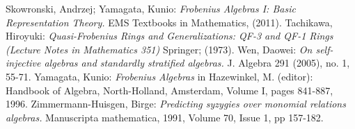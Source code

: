 \documentclass[a4paper]{amsart}
\theoremstyle{definition}
\theoremstyle{remark}
\numberwithin{equation}{theorem}
\begin{document}
\begin{thebibliography}{Gus}
 Skowronski, Andrzej; Yamagata, Kunio: {\it Frobenius Algebras I: Basic Representation Theory.} EMS Textbooks in Mathematics, (2011).
 Tachikawa, Hiroyuki: {\it Quasi-Frobenius Rings and Generalizations: QF-3 and QF-1 Rings (Lecture Notes in Mathematics 351) } Springer; (1973).
 Wen, Daowei: {\it On self-injective algebras and standardly stratified algebras.} J. Algebra 291 (2005), no. 1, 55-71. 
 Yamagata, Kunio: {\it Frobenius Algebras} in
 {Hazewinkel, M. (editor): Handbook of Algebra, North-Holland, Amsterdam, Volume I, pages 841-887, 1996.}
 Zimmermann-Huisgen, Birge: {\it Predicting syzygies over monomial relations algebras.} Manuscripta mathematica, 1991, Volume 70, Issue 1, pp 157-182.
\end{thebibliography}
\end{document}

